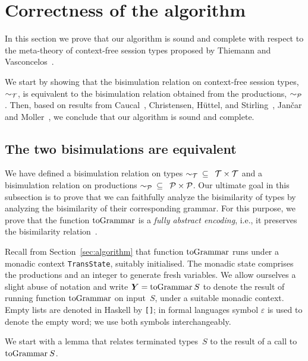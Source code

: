 \section{Correctness of the algorithm}
\label{sec:soundness}

In this section we prove that our algorithm is sound and complete
with respect to the meta-theory of context-free session types proposed
by Thiemann and Vasconcelos~\cite{thiemann2016context}.

We start by showing that the bisimulation relation on context-free
session types, $\sim_\mathcal T$, is equivalent to the bisimulation
relation obtained from the productions, $\sim_\mathcal P$.  Then, based on
results from Caucal~\cite{caucal1986decidabilite}, Christensen,
H{\"{u}}ttel, and Stirling~\cite{DBLP:journals/iandc/ChristensenHS95},
Jan{\v{c}}ar and Moller~\cite{janvcar1999techniques}, we conclude that
our algorithm is sound and complete.

\subsection{The two bisimulations are equivalent}

We have defined a bisimulation relation on types 
$\sim_\mathcal T \enspace\subseteq \enspace\mathcal{T} \times \mathcal{T}$
and a bisimulation relation on productions 
$\sim_\mathcal P \enspace\subseteq \enspace\mathcal{P} \times \mathcal{P}$.
Our ultimate goal in this subsection is to prove that we can 
faithfully analyze the bisimilarity of types 
by analyzing the bisimilarity of their corresponding
grammar. For this purpose, we prove that the function $\toGrammark$ 
is a {\it fully abstract encoding}, i.e., it preserves the 
bisimilarity relation~\cite{gorla2016full}.

Recall from Section~\ref{sec:algorithm} that function $\toGrammark$ 
runs under a monadic context
\lstinline|TransState|, suitably initialised.
%
The monadic state comprises the productions and an integer to generate
fresh variables.
%
We allow ourselves a slight abuse of notation and write
$\vec Y = \toGrammarf S$ to denote the result of running function
$\toGrammark$ on input~$S$, under a suitable monadic context.
%
Empty lists are denoted in Haskell by \lstinline|[]|;
in formal languages symbol $\varepsilon$ is used to denote the empty
word; we use both symbols interchangeably.

We start with a lemma that relates terminated types~$S$ to the result 
of a call to $\toGrammarf S$.

